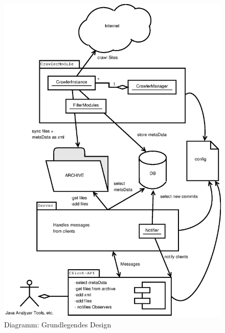 \begin{figure}
	\centering
	\label{spec:dia:moduls}
	\includegraphics[width=\textwidth]{spec/components.eps}
	\caption{Diagramm: Grundlegendes Design}
\end{figure}
 
